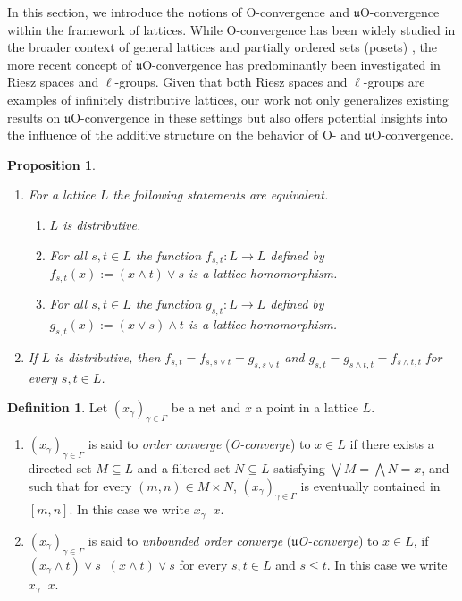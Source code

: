 \documentclass[12pt,a4paper]{amsart}
\numberwithin{equation}{section}
\newtheorem{prop}[thm]{Proposition}
\theoremstyle{definition}
\newtheorem{defn}{Definition}
\newcommand{\converges}[1]{\mathop{\overset{\text{#1}}{\longrightarrow}}}
\begin{document}
In this section, we introduce the notions of O-convergence and $\mathfrak{u}$O-convergence within the framework of lattices. While O-convergence has been widely studied in the broader context of general lattices and partially ordered sets (posets) \cite{Erne1980,Gingras,MathewsAnderson1967, Rennie1951,Ward1955,WOLK1961}, the more recent concept of $\mathfrak{u}$O-convergence has predominantly been investigated in Riesz spaces and $\ell$-groups. Given that both Riesz spaces and $\ell$-groups are examples of infinitely distributive lattices, our work not only generalizes existing results on $\mathfrak{u}$O-convergence in these settings but also offers potential insights into the influence of the additive structure on the behavior of O- and $\mathfrak{u}$O-convergence.

\begin{prop}\cite[Proposition 3.10]{KAECWH2}\label{a}
	\begin{enumerate}[{\rm(a)}]
	\item For a lattice $L$ the following statements are equivalent.
	\begin{enumerate}[{\rm(i)}]
		\item  $L$ is distributive.
		\item For all $s,t\in L$ the function $f_{s,t}: L \to L$ defined by $f_{s,t}(x):= (x \wedge t) \vee s$ is a lattice homomorphism.
		\item  For all $s,t\in L$ the function $g_{s,t}: L \to L$ defined by  $g_{s,t}(x):= (x \vee s) \wedge t$ is a lattice homomorphism.
	\end{enumerate}
\item  If $L$ is distributive, then
$f_{s,t}=f_{s,s\vee t}=g_{s,s\vee t}$ and  $g_{s,t}=g_{s\wedge t,t}=f_{s\wedge t,t}$
for every $s,t\in L$.
\end{enumerate}
\end{prop}
 



\begin{defn}\label{d1}
Let $(x_\gamma)_{\gamma\in \Gamma}$ be a net and  $x$ a point in a lattice $L$.
\begin{enumerate}[{\rm(i)}]
\item  $(x_\gamma)_{\gamma \in \Gamma}$ is said to \emph{order converge} (\emph{O-converge}) to $x\in L$ if  there exists a directed set $M\subseteq L$ and a filtered  set $N\subseteq L$ satisfying $\bigvee M=\bigwedge N=x$, and such that for every $(m,n)\in M\times N$, $(x_{\gamma})_{\gamma\in\Gamma}$ is eventually contained in $[m,n]$.  In this case we write $x_\gamma\converges{O}x$.
    \item $(x_\gamma)_{\gamma \in \Gamma}$ is said to \emph{unbounded order converge} (\emph{$\mathfrak{u}$O-converge}) to $x \in L$, if $ (x_{\gamma} \wedge t) \vee s  \converges{O} (x \wedge t) \vee s$ for every $s,t \in L$ and $s \leq t$.  In this case we write $x_\gamma\converges{$\mathfrak{u}O$}x$.
\end{enumerate}
\end{defn}
\end{document}
